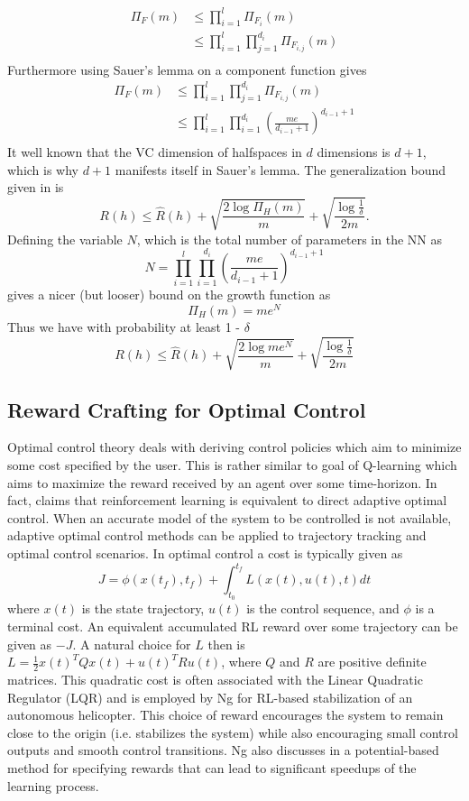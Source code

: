 \documentclass{article} %
\begin{document}
\begin{align*}
\Pi_F(m) &\leq \prod_{i=1}^l \Pi_{F_i}(m)\\
& \leq \prod_{i=1}^l\prod_{j=1}^{d_i} \Pi_{F_{i,j}}(m)\\
\end{align*}
Furthermore using Sauer's lemma on a component function gives
\begin{align*}
\Pi_F(m)& \leq \prod_{i=1}^l\prod_{j=1}^{d_i} \Pi_{F_{i,j}}(m)\\
& \leq \prod_{i=1}^l\prod_{i=1}^{d_i}(\frac{me}{d_{i-1}+1})^{d_{i-1}+1}\\
\end{align*}
It well known that the VC dimension of halfspaces in $d$ dimensions is $d +1$, which is why $d+1$ manifests itself in Sauer's lemma.
The generalization bound given in \cite{mohri} is 
$$
R(h) \leq \widehat{R}(h) + \sqrt{\frac{2\log{\Pi_H{(m)}}}{m}} + \sqrt{\frac{\log{\frac{1}{\delta}}}{2m}}.
$$
Defining the variable $N$, which is the total number of parameters in the NN as 
$$
N = \prod_{i=1}^l\prod_{i=1}^{d_i}(\frac{me}{d_{i-1}+1})^{d_{i-1}+1}
$$ 
gives a nicer (but looser) bound on the growth function as
$$
\Pi_H{(m)} = me^N
$$
Thus we have with probability at least 1 - $\delta$
$$
R(h) \leq \widehat{R}(h) + \sqrt{\frac{2\log{me^N}}{m}} + \sqrt{\frac{\log{\frac{1}{\delta}}}{2m}}
$$

\subsection{Reward Crafting for Optimal Control}
Optimal control theory deals with deriving control policies which aim to minimize some cost specified by the user.  This is rather similar to goal of Q-learning which aims to maximize the reward received by an agent over some time-horizon.  In fact, \cite{sutton} claims that reinforcement learning is equivalent to direct adaptive optimal control.  When an accurate model of the system to be controlled is not available, adaptive optimal control methods can be applied to trajectory tracking and optimal control scenarios.  In optimal control a cost is typically given as 
$$J = \phi(x(t_f),t_f) + \int_{t_0}^{t_f} L(x(t),u(t),t)dt$$
where $x(t)$ is the state trajectory, $u(t)$ is the control sequence, and $\phi$ is a terminal cost.  An equivalent accumulated RL reward over some trajectory can be given as $-J$.  A natural choice for $L$ then is $L = \frac{1}{2}x(t)^TQx(t) + u(t)^TRu(t)$, where $Q$ and $R$ are positive definite matrices.  This quadratic cost is often associated with the Linear Quadratic Regulator (LQR) \cite{lqr} and is employed by Ng \cite{ng_autonomous_2006} for RL-based stabilization of an autonomous helicopter.  This choice of reward encourages the system to remain close to the origin (i.e. stabilizes the system) while also encouraging small control outputs and smooth control transitions.  Ng also discusses in \cite{ng_thesis} a potential-based method for specifying rewards that can lead to significant speedups of the learning process.
\end{document}
